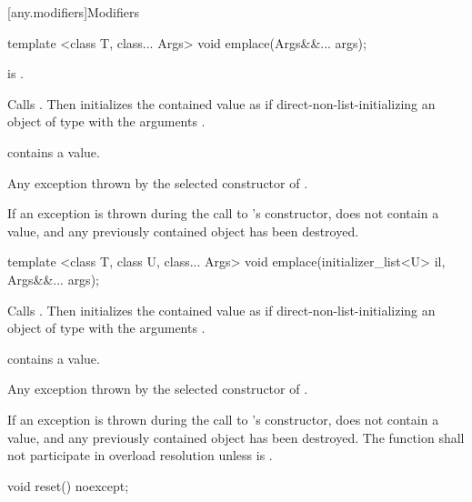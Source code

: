 [any.modifiers]{Modifiers}

%
\begin{itemdecl}
template <class T, class... Args>
  void emplace(Args&&... args);
\end{itemdecl}

\begin{itemdescr}
\pnum
\requires {} is .

\pnum
\effects Calls .
Then initializes the contained value as if direct-non-list-initializing
an object of type  with the arguments .

\pnum
\postconditions {} contains a value.

\pnum
\throws Any exception thrown by the selected constructor of .

\pnum
\remarks If an exception is thrown during the call to 's constructor,
 does not contain a value, and any previously contained object
has been destroyed.
\end{itemdescr}

%
\begin{itemdecl}
template <class T, class U, class... Args>
  void emplace(initializer_list<U> il, Args&&... args);
\end{itemdecl}

\begin{itemdescr}
\pnum
\effects Calls . Then initializes the contained value
as if direct-non-list-initializing an object of type  with the arguments
.

\pnum
\postconditions {} contains a value.

\pnum
\throws Any exception thrown by the selected constructor of .

\pnum
\remarks If an exception is thrown during the call to 's constructor,
 does not contain a value, and any previously contained object
has been destroyed.
The function shall not participate in overload resolution unless
 is .
\end{itemdescr}

%
\begin{itemdecl}
void reset() noexcept;
\end{itemdecl}

